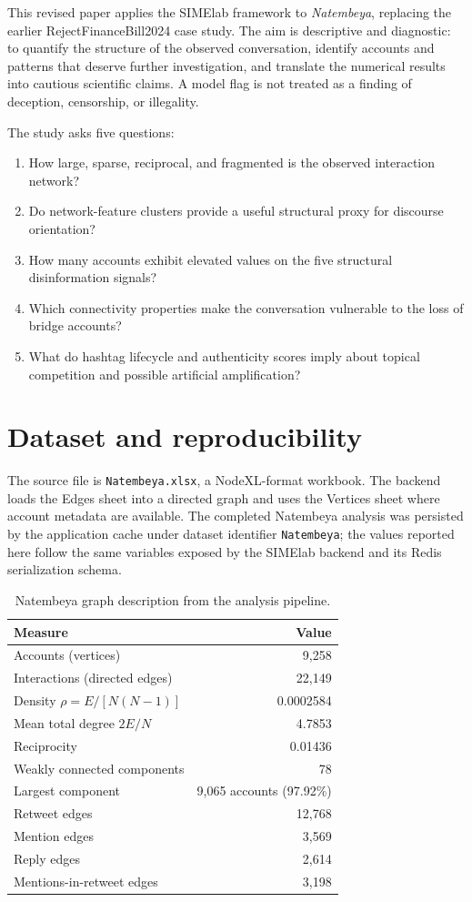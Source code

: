 \documentclass[11pt]{article}
\newcommand{\Nat}{\textit{Natembeya}}
\begin{document}
This revised paper applies the SIMElab framework to \Nat{}, replacing the earlier RejectFinanceBill2024 case study. The aim is descriptive and diagnostic: to quantify the structure of the observed conversation, identify accounts and patterns that deserve further investigation, and translate the numerical results into cautious scientific claims. A model flag is not treated as a finding of deception, censorship, or illegality.

The study asks five questions:
\begin{enumerate}
  \item How large, sparse, reciprocal, and fragmented is the observed interaction network?
  \item Do network-feature clusters provide a useful structural proxy for discourse orientation?
  \item How many accounts exhibit elevated values on the five structural disinformation signals?
  \item Which connectivity properties make the conversation vulnerable to the loss of bridge accounts?
  \item What do hashtag lifecycle and authenticity scores imply about topical competition and possible artificial amplification?
\end{enumerate}

\section{Dataset and reproducibility}

The source file is \texttt{Natembeya.xlsx}, a NodeXL-format workbook. The backend loads the Edges sheet into a directed graph and uses the Vertices sheet where account metadata are available. The completed Natembeya analysis was persisted by the application cache under dataset identifier \texttt{Natembeya}; the values reported here follow the same variables exposed by the SIMElab backend and its Redis serialization schema.

\begin{table}[h]
\centering
\caption{Natembeya graph description from the analysis pipeline.}
\begin{tabular}{lr}
\toprule
Measure & Value\\
\midrule
Accounts (vertices) & 9,258\\
Interactions (directed edges) & 22,149\\
Density $\rho=E/[N(N-1)]$ & 0.0002584\\
Mean total degree $2E/N$ & 4.7853\\
Reciprocity & 0.01436\\
Weakly connected components & 78\\
Largest component & 9,065 accounts (97.92\%)\\
Retweet edges & 12,768\\
Mention edges & 3,569\\
Reply edges & 2,614\\
Mentions-in-retweet edges & 3,198\\
\bottomrule
\end{tabular}
\end{table}
\end{document}
